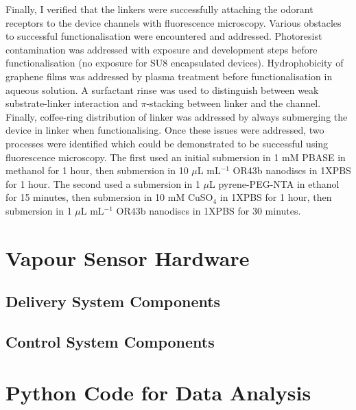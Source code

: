 \documentclass[
  a4paper,
]{scrbook}
\begin{document}
Finally, I verified that the linkers were successfully attaching the
odorant receptors to the device channels with fluorescence microscopy.
Various obstacles to successful functionalisation were encountered and
addressed. Photoresist contamination was addressed with exposure and
development steps before functionalisation (no exposure for SU8
encapsulated devices). Hydrophobicity of graphene films was addressed by
plasma treatment before functionalisation in aqueous solution. A
surfactant rinse was used to distinguish between weak substrate-linker
interaction and \(\pi\)-stacking between linker and the channel.
Finally, coffee-ring distribution of linker was addressed by always
submerging the device in linker when functionalising. Once these issues
were addressed, two processes were identified which could be
demonstrated to be successful using fluorescence microscopy. The first
used an initial submersion in 1 mM PBASE in methanol for 1 hour, then
submersion in 10 \(\mu\)L mL\(^{-1}\) OR43b nanodiscs in 1XPBS for 1
hour. The second used a submersion in 1 \(\mu\)L pyrene-PEG-NTA in
ethanol for 15 minutes, then submersion in 10 mM CuSO\(_4\) in 1XPBS for
1 hour, then submersion in 1 \(\mu\)L mL\(^{-1}\) OR43b nanodiscs in
1XPBS for 30 minutes.

\cleardoublepage
{}
{}
\appendix

\hypertarget{sec-vapour-sensor-components}{%
\chapter{Vapour Sensor Hardware}\label{sec-vapour-sensor-components}}

\hypertarget{delivery-system-components}{%
\section{Delivery System Components}\label{delivery-system-components}}

\hypertarget{control-system-components}{%
\section{Control System Components}\label{control-system-components}}

\hypertarget{sec-python}{%
\chapter{Python Code for Data Analysis}\label{sec-python}}
\end{document}
